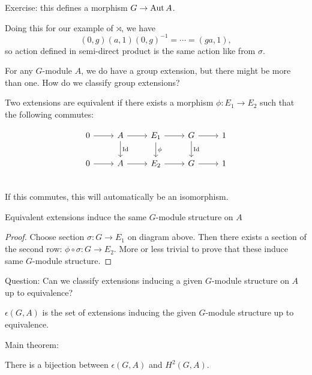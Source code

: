 Exercise: this defines a morphism  $G \to  \operatorname{Aut} A$.


Doing this for our example of $\rtimes$, we have
 \[
     (0,g) (a,1) (0,g)^{-1} = \cdots = (ga,1)
,\] 
so action defined in semi-direct product is the same action like from $\sigma$.

For any $G$-module $A$, we do have a group extension, but there might be more than one.
How do we classify group extensions?

\begin{definition}
    Two extensions are equivalent if there exists a morphism $\phi: E_1 \to  E_2$ such that the following commutes:

    \[
        \begin{tikzcd}
            0 \arrow[r, ""] 
            & A \arrow[r, ""] \arrow[d, "\operatorname{Id}"]
            & E_1 \arrow[r, ""] \arrow[d, "\phi"]
            & G \arrow[r, ""] \arrow[d, "\operatorname{Id}"]
            & 1 \\
            0 \arrow[r, ""] 
            & A \arrow[r, ""]
            & E_2 \arrow[r, ""]
            & G \arrow[r, ""]
            & 1 \\
        \end{tikzcd}
    \]
    If this commutes, this will automatically be an isomorphism.
\end{definition}

\begin{prop}
Equivalent extensions induce the same $G$-module structure on $A$
\end{prop}
\begin{proof}
    Choose section $\sigma: G \to  E_1$ on diagram above.
    Then there exists a section of the second row: $\phi  \circ  \sigma: G \to  E_2$.
    More or less trivial to prove that these induce same $G$-module structure.
\end{proof}

Question: Can we classify extensions inducing a given $G$-module structure on $A$ up to equivalence?

\begin{definition}
    $\epsilon(G, A)$ is the set of extensions inducing the given  $G$-module structure up to equivalence.
\end{definition}

Main theorem:
\begin{theorem}
    There is a bijection between $\epsilon(G, A)$ and  $H^2(G, A)$.
\end{theorem}

